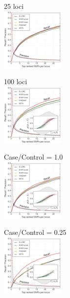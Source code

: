 \documentclass[a0paper,portrait,debug]{baposter}
\begin{document}
\begin{poster}
{\begin{multicols}{4}
  {\begin{center}
   25 loci \\
   \includegraphics[width=0.23\textwidth]{pip_prc_normal_h06_c2_l100_100pheno_25summary_25loci_cred.pdf}
   \end{center}
  }
  {\begin{center}
   100 loci \\
   \includegraphics[width=0.23\textwidth]{pip_prc_normal_h06_c2_l100_cred.pdf}
   \end{center}
  }
  {\begin{center}
   Case/Control = 1.0 \\
   \includegraphics[width=0.23\textwidth]{pip_prc_normal_h04_c2_l100_cred.pdf}
   \end{center}
  }
  {\begin{center}
   Case/Control = 0.25 \\
   \includegraphics[width=0.23\textwidth]{pip_prc_normal_h04_c2_l025_cred.pdf}
   \end{center}
  }
\end{multicols}
}


\end{poster}
\end{document}
